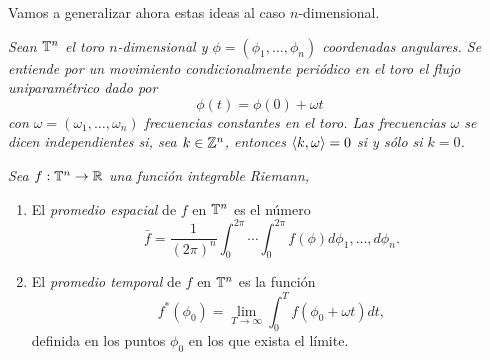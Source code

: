 Vamos a generalizar ahora estas ideas al caso $n$-dimensional.

\begin{defn}
  \em
  Sean $\mathbb{T}^n$ el toro $n$-dimensional y $\phi=(\phi_1,\dots,\phi_n)$ coordenadas angulares. Se entiende por un \emph{movimiento condicionalmente periódico} en el toro el flujo uniparamétrico dado por 
  \begin{equation*}
    \phi(t)=\phi(0)+\omega t
  \end{equation*}
  con $\omega=(\omega_1,\dots,\omega_n)$ \emph{frecuencias} constantes en el toro. Las frecuencias $\omega$ se dicen \emph{independientes} si, sea $k \in \mathbb{Z}^n$, entonces $\left\langle k,\omega\right\rangle=0$ si y sólo si $k=0$.
\end{defn}
\begin{defn}
  \em
  Sea $f:\mathbb{T}^n \rightarrow \mathbb{R}$ una función integrable Riemann,
  \begin{enumerate}
    \item El \emph{promedio espacial} de $f$ en $\mathbb{T}^n$ es el número
      \begin{equation*}
	\bar{f}=\frac{1}{(2\pi)^n}\int_0^{2\pi} \cdots \int_0^{2\pi} f(\phi) d\phi_1,\dots,d\phi_n.
      \end{equation*}
    \item El \emph{promedio temporal} de $f$ en $\mathbb{T}^n$ es la función
      \begin{equation*}
	f^*(\phi_0)=\lim_{T\rightarrow \infty} \int_0^{T}f(\phi_0+\omega t) dt,
      \end{equation*}
      definida en los puntos $\phi_0$ en los que exista el límite.
  \end{enumerate}
\end{defn}

